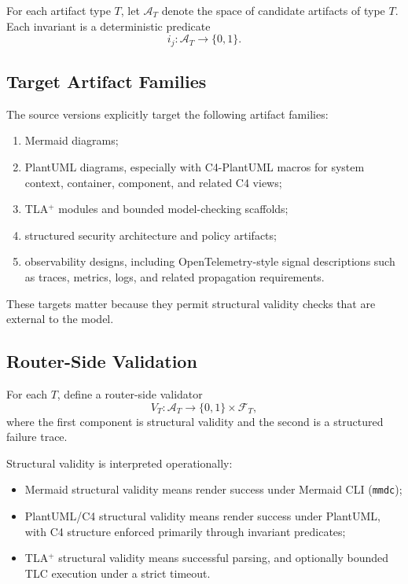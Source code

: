 \documentclass[11pt,a4paper]{article}
\numberwithin{equation}{section}
\theoremstyle{definition}
\newcommand{\Artifacts}{\mathcal{A}}
\begin{document}
For each artifact type \(T\), let \(\Artifacts_T\) denote the space of candidate artifacts of type \(T\). Each invariant is a deterministic predicate
\[
i_j : \Artifacts_T \to \{0,1\}.
\]

\subsection{Target Artifact Families}

The source versions explicitly target the following artifact families:
\begin{enumerate}[label=(\alph*),leftmargin=2.25em]
    \item Mermaid diagrams;
    \item PlantUML diagrams, especially with C4-PlantUML macros for system context, container, component, and related C4 views;
    \item TLA\(^+\) modules and bounded model-checking scaffolds;
    \item structured security architecture and policy artifacts;
    \item observability designs, including OpenTelemetry-style signal descriptions such as traces, metrics, logs, and related propagation requirements.
\end{enumerate}

These targets matter because they permit structural validity checks that are external to the model.

\subsection{Router-Side Validation}

For each \(T\), define a router-side validator
\[
V_T : \Artifacts_T \to \{0,1\}\times \mathcal{F}_T,
\]
where the first component is structural validity and the second is a structured failure trace.

Structural validity is interpreted operationally:
\begin{itemize}[leftmargin=2em]
    \item Mermaid structural validity means render success under Mermaid CLI (\texttt{mmdc});
    \item PlantUML/C4 structural validity means render success under PlantUML, with C4 structure enforced primarily through invariant predicates;
    \item TLA\(^+\) structural validity means successful parsing, and optionally bounded TLC execution under a strict timeout.
\end{itemize}
\end{document}
